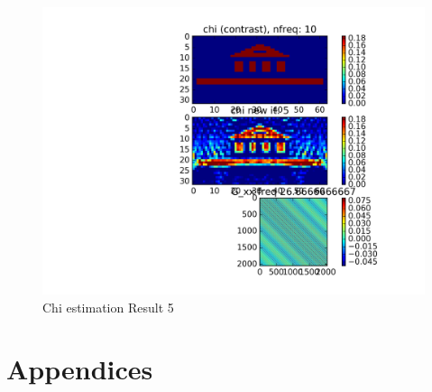 \documentclass[10pt,a4paper]{article}
\begin{document}
\begin{figure}
\centering
 \includegraphics[scale=0.75]{Chi_est_it04.png}
  \caption{Chi estimation Result 5}
  \label{fig:fig8}
\end{figure}

\newpage
\nocite{*}



\clearpage

\appendix
\section{Appendices}
\end{document}
